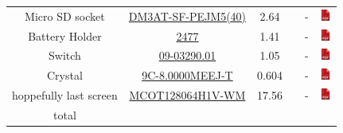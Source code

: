 \documentclass[12pt,a4paper,landscape]{article}
\begin{document}
{\begin{tabular}{|c|c|c|c|c|c|}
					Micro SD socket &
					\href{http://fr.farnell.com/hirose-hrs/dm3at-sf-pejm5-40/connecteur-micro-sd-push-push/dp/1764374}
					{DM3AT-SF-PEJM5(40)} & 2.64 & &
					- &
					\href{http://www.farnell.com/datasheets/1697167.pdf}{\includegraphics[height=1em]{pdf.png}}\\
					    
					Battery Holder &
					\href{http://fr.farnell.com/keystone/2477/battery-holder-pcb/dp/1650684}
					{2477} & 1.41 & &
					- &
					\href{http://www.farnell.com/datasheets/1703957.pdf}{\includegraphics[height=1em]{pdf.png}}\\
					    
					Switch &
					\href{http://fr.farnell.com/eoz/09-03290-01/commutateur-a-glissiere/dp/674345}
					{09-03290.01} & 1.05 & &
					- &
					\href{http://www.farnell.com/datasheets/2010029.pdf}{\includegraphics[height=1em]{pdf.png}}\\

					Crystal &
					\href{http://fr.farnell.com/txc/9c-8-000meej-t/xtal-8-000mhz-18pf-smd-hc-49s/dp/1842347}
					{9C-8.0000MEEJ-T} & 0.604 & &
					- &
					\href{http://www.farnell.com/datasheets/1497895.pdf}{\includegraphics[height=1em]{pdf.png}}\\

					hoppefully last screen &
					\href{http://fr.farnell.com/midas/mcot128064h1v-wm/afficheur-graphique-oled-tab-128x64/dp/2817924?st=oled}
					{MCOT128064H1V-WM} & 17.56 & &
					- &
					\href{http://www.farnell.com/datasheets/2549026.pdf}{\includegraphics[height=1em]{pdf.png}}\\
					    
					\hline
					total & & & & &\\
					\hline
				\end{tabular}
			}
\end{document}
